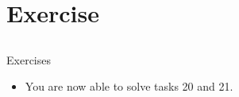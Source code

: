 \section{Exercise}
\subsection{}
\begin{frame}{Exercises}
	\begin{itemize}
		\item You are now able to solve tasks 20 and 21.
	\end{itemize}
\end{frame}


